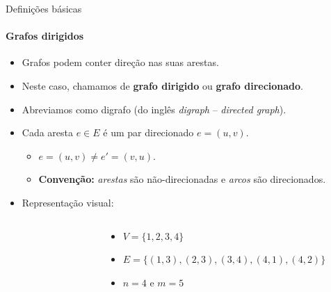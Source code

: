 \begin{frame}{Definições básicas}
	\framesubtitle{Grafos dirigidos}
	
	\begin{itemize}
		\item Grafos podem conter direção nas suas arestas.
		\item Neste caso, chamamos de \textbf{grafo dirigido} ou \textbf{grafo direcionado}.
		\item Abreviamos como digrafo (do inglês \textit{digraph} -- \textit{directed graph}).
		\item Cada aresta $e \in E$ é um par direcionado $e = (u, v)$.
		\begin{itemize}
			\item $e = (u, v) \ne e' = (v, u)$.
			\item \textbf{Convenção:} \textit{arestas} são não-direcionadas e \textit{arcos} são direcionados.
		\end{itemize}
	
		\pause
		\item {\color{magenta}Representação visual:}
	\end{itemize}

	\vspace{-12pt}
	
	\begin{columns}
		\begin{column}{0.35\textwidth}
			\begin{figure}		
				
			\end{figure}
		\end{column}
		\begin{column}{0.65\textwidth}
			\begin{itemize}
				\item $V = \{1, 2, 3, 4\}$
				\item $E = \{(1, 3), (2, 3), (3, 4), (4, 1), (4, 2)\}$
				\item $n = 4$ e $m = 5$
			\end{itemize}
		\end{column}
	\end{columns}
\end{frame}



